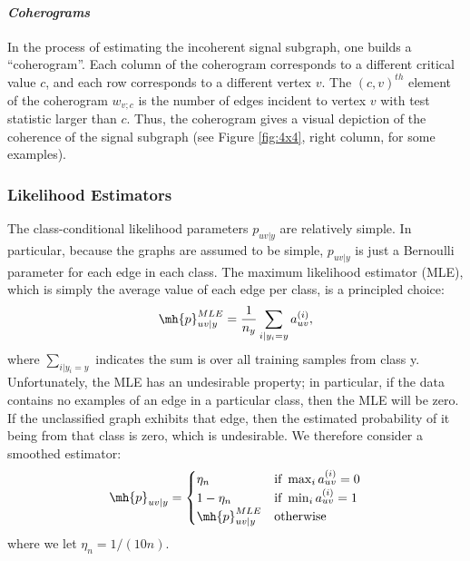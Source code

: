 \documentclass[10pt,journal,cspaper,compsoc]{IEEEtran}
\begin{document}
\paragraph{\emph{Coherograms}}

In the process of estimating the incoherent signal subgraph, one builds a ``coherogram''.  Each column of the coherogram corresponds to a different critical value $c$, and each row corresponds to a different vertex $v$.  The $(c,v)^{th}$ element of the coherogram $w_{v;c}$ is the number of edges incident to vertex $v$ with test statistic larger than $c$.  Thus, the coherogram gives a visual depiction of the coherence of the signal subgraph (see Figure \ref{fig:4x4}, right column, for some examples).


\subsubsection{Likelihood Estimators} %
\label{sub:likelihood}

The class-conditional likelihood parameters $p_{uv|y}$ are relatively simple.  In particular, because the graphs are assumed to be simple, $p_{uv|y}$ is just a Bernoulli parameter for each edge in each class.  The maximum likelihood estimator (MLE), which is simply the average value of each edge per class, is a principled choice:
\begin{align}
\mh{p}_{uv|y}^{MLE} = \frac{1}{n_y} \sum_{i | y_i = y} a_{uv}^{(i)},
\end{align}
where $\sum_{i | y_i=y}$ indicates the sum is over all training samples from class y. Unfortunately, the MLE has an undesirable property; in particular, if the data contains no examples of an edge in a particular class, then the MLE will be zero.  If the unclassified graph exhibits that edge, then the estimated probability of it being from that class is zero, which is undesirable. We therefore consider a smoothed estimator:
\begin{align} \label{eq:lik}
\mh{p}_{uv|y} = 
\begin{cases}
\eta_n & \text{if } \max_i a_{uv}^{(i)}=0 \\
1- \eta_n & \text{if } \min_i a_{uv}^{(i)}=1 \\
\mh{p}_{uv|y}^{MLE} & \text{otherwise}
\end{cases}
\end{align}
where we let $\eta_n=1/(10n)$.  
\end{document}
